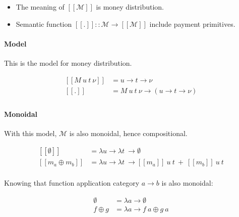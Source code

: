 \begin{itemize}
\item The meaning of $[\![\mathcal{M}]\!]$ is money distribution.
\item Semantic function $[\![.]\!] :: \mathcal{M} \rightarrow [\![\mathcal{M}]\!] $ include payment primitives.
\end{itemize}

\paragraph{Model}

This is the model for money distribution.

\begin{equation}\label{md_model}
    \begin{split}
        [\![M\ u\ t\ \nu]\!] &= u \rightarrow t \rightarrow \nu \\
        [\![.]\!] &= M\ u\ t\ \nu \rightarrow (u \rightarrow t \rightarrow \nu) \\
    \end{split}
\end{equation}

\paragraph{Monoidal}

With this model, $\mathcal{M}$ is also monoidal, hence compositional.

\begin{equation}
    \begin{split}
        [\![\emptyset]\!] &= \lambda u \rightarrow \lambda t\ \rightarrow \emptyset \\
        [\![m_a \oplus m_b]\!] &= \lambda u \rightarrow \lambda t\ \rightarrow [\![m_a]\!]\ u\ t\ +\ [\![m_b]\!]\ u\ t \\
    \end{split}
\end{equation}

Knowing that function application category $a \rightarrow b$ is also monoidal:

\begin{equation}
    \begin{split}
        \emptyset &= \lambda a \rightarrow \emptyset \\
        f \oplus g &= \lambda a \rightarrow f\ a \oplus g\ a \\
    \end{split}
\end{equation}

